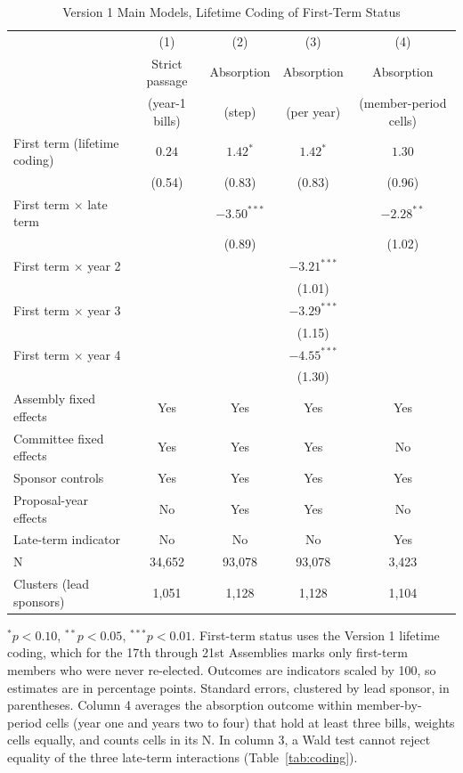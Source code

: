 \documentclass[11pt]{article}
\begin{document}
\begin{table}[H]
\centering
\singlespacing
\caption{Version 1 Main Models, Lifetime Coding of First-Term Status}
\label{tab:main}
\small
\begin{tabular}{lcccc}
\toprule
& (1) & (2) & (3) & (4) \\
& Strict passage & Absorption & Absorption & Absorption \\
& (year-1 bills) & (step) & (per year) & (member-period cells) \\
\midrule
First term (lifetime coding) & $0.24$ & $1.42^{*}$ & $1.42^{*}$ & $1.30$ \\
& (0.54) & (0.83) & (0.83) & (0.96) \\
First term $\times$ late term & & $-3.50^{***}$ & & $-2.28^{**}$ \\
& & (0.89) & & (1.02) \\
First term $\times$ year 2 & & & $-3.21^{***}$ & \\
& & & (1.01) & \\
First term $\times$ year 3 & & & $-3.29^{***}$ & \\
& & & (1.15) & \\
First term $\times$ year 4 & & & $-4.55^{***}$ & \\
& & & (1.30) & \\
\midrule
Assembly fixed effects & Yes & Yes & Yes & Yes \\
Committee fixed effects & Yes & Yes & Yes & No \\
Sponsor controls & Yes & Yes & Yes & Yes \\
Proposal-year effects & No & Yes & Yes & No \\
Late-term indicator & No & No & No & Yes \\
N & 34,652 & 93,078 & 93,078 & 3,423 \\
Clusters (lead sponsors) & 1,051 & 1,128 & 1,128 & 1,104 \\
\bottomrule
\end{tabular}

\smallskip
\begin{minipage}{0.95\textwidth}
\footnotesize $^{*}p<0.10$, $^{**}p<0.05$, $^{***}p<0.01$. First-term status uses the Version 1 lifetime coding, which for the 17th through 21st Assemblies marks only first-term members who were never re-elected. Outcomes are indicators scaled by 100, so estimates are in percentage points. Standard errors, clustered by lead sponsor, in parentheses. Column 4 averages the absorption outcome within member-by-period cells (year one and years two to four) that hold at least three bills, weights cells equally, and counts cells in its N. In column 3, a Wald test cannot reject equality of the three late-term interactions (Table~\ref{tab:coding}).
\end{minipage}
\end{table}
\end{document}
